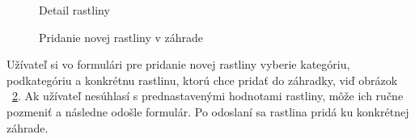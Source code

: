 \documentclass[twoside]{ctuthesis}
\theoremstyle{plain}
\theoremstyle{definition}
\theoremstyle{note}
\begin{document}
\begin{figure}[H]
\caption{Detail rastliny}
\label{fig:nahladRastliny}
\end{figure}

\begin{figure}[H]
\caption{Pridanie novej rastliny v záhrade}
\label{fig:pridanieRastliny}
\end{figure}

Užívateľ si vo formulári pre pridanie novej rastliny vyberie kategóriu, podkategóriu a konkrétnu rastlinu, ktorú chce pridať do záhradky, viď obrázok  ~\ref{fig:pridanieRastliny}. Ak užívateľ nesúhlasí s prednastavenými hodnotami rastliny, môže ich ručne pozmeniť a následne odošle formulár. Po odoslaní sa rastlina pridá ku konkrétnej záhrade.
\end{document}
